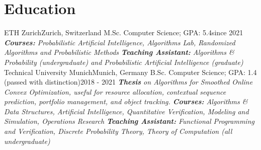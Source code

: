 \documentclass[a4paper,20pt]{article}
\begin{document}
\section{Education}
  \resumeSubHeadingListStart
    \resumeSubheading
      {ETH Zurich}{Zurich, Switzerland}
      {M.Sc. Computer Science; GPA: 5.4}{since 2021}
      {\scriptsize \textit{ \footnotesize{\newline{}\textbf{Courses:} Probabilistic Artificial Intelligence, Algorithms Lab, Randomized Algorithms and Probabilistic Methods}
      \footnotesize{\newline{}\textbf{Teaching Assistant:} Algorithms \& Probability (undergraduate) and Probabilistic Artificial Intelligence (graduate)}}}
    \resumeSubHeadingListEnd
\vspace{-5pt}
  \resumeSubHeadingListStart
    \resumeSubheading
      {Technical University Munich}{Munich, Germany}
      {B.Sc. Computer Science; GPA: 1.4 (passed with distinction)}{2018 - 2021}
      {\scriptsize \textit{
      \footnotesize{\newline{}\textbf{Thesis} on Algorithms for Smoothed Online Convex Optimization, useful for resource allocation, contextual sequence prediction, portfolio management, and object tracking.} \footnotesize{\newline{}\textbf{Courses:} Algorithms \& Data Structures, Artificial Intelligence, Quantitative Verification, Modeling and Simulation, Operations Research}
      \footnotesize{\newline{}\textbf{Teaching Assistant:} Functional Programming and Verification, Discrete Probability Theory, Theory of Computation (all undergraduate)}}}
    \resumeSubHeadingListEnd

\vspace{-5pt}
\end{document}
